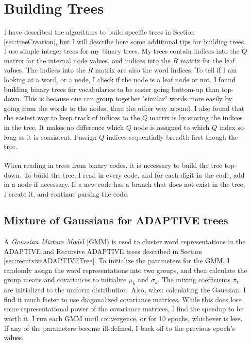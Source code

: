 \section{Building Trees}
\paragraph{}
I have described the algorithms to build specific trees in Section \ref{sec:treeCreation}, but I will describe here some additional tips for building trees. I use simple integer trees for my binary trees. My trees contain indices into the $Q$ matrix for the internal node values, and indices into the $R$ matrix for the leaf values. The indices into the $R$ matrix are also the word indices. To tell if I am looking at a word, or a node, I check if the node is a leaf node or not.  I found building binary trees for vocabularies to be easier going bottom-up than top-down. This is because one can group together "similar" words more easily by going from the words to the nodes, than the other way around. I also found that the easiest way to keep track of indices to the $Q$ matrix is by storing the indices in the tree. It makes no difference which $Q$ node is assigned to which $Q$ index so long as it is consistent. I assign $Q$ indices sequentially breadth-first though the tree. 
\paragraph{}
When reading in trees from binary codes, it is necessary to build the tree top-down. To build the tree, I read in every code, and for each digit in the code, add in a node if necessary. If a new code has a branch that does not exist in the tree, I create it, and continue parsing the code.

\subsection{Mixture of Gaussians for ADAPTIVE trees}
\paragraph{}
A \emph{Gaussian Mixture Model} (GMM) is used to cluster word representations in the ADAPTIVE and Recursive ADAPTIVE trees described in Section \ref{sec:recursiveADAPTIVETree}. To initialize the parameters for the GMM, I randomly assign the word representations into two groups, and then calculate the group means and covariances to initialize $\mu_k$ and $\sigma_k$. The mixing coefficients $\pi_k$ are initialized to the uniform distribution. Also, when calculating the Gaussian, I find it much faster to use diagonalized covariance matrices. While this does lose some representational power of the covariance matrices, I find the speedup to be worth it. I run each GMM until convergence, or for 10 epochs, whichever is less. If any of the parameters become ill-defined, I back off to the previous epoch's values. 

